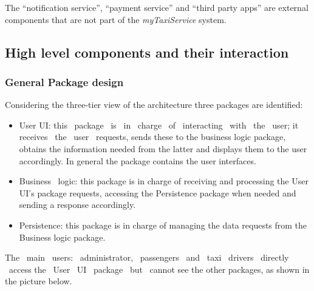 \documentclass[a4paper,11pt]{report} %
\newcommand{\mts}{\mbox{\normalfont\itshape myTaxiService}}
\begin{document}
	The ``notification service'', ``payment service'' and ``third party apps'' are external components that are not part of the \mts{} system.	
	
	\subsection{High level components and their interaction} 
	

	
	\subsubsection{General Package design}
	Considering the three-tier view of the architecture three packages are identified: 
	\begin{itemize}
		\item User UI: this  package  is  in  charge  of  interacting  with  the  user; it  receives  the  user  requests, sends these to the business logic package, obtains the information needed from the latter and displays them to the user accordingly. In general the package contains the user interfaces.
		\item Business  logic: this package is in charge of receiving and processing the User UI's package requests, accessing the Persistence package when needed and sending a response accordingly. 
		\item Persistence: this package is in charge of managing the data requests from the Business logic package.
	\end{itemize}
	The  main  users:  administrator,  passengers  and  taxi  drivers  directly  access the  User  UI  package  but  cannot see the other packages, as shown in the picture below. \\
	\begin{minipage}{\linewidth}
	\end{minipage}	
	
\end{document}
